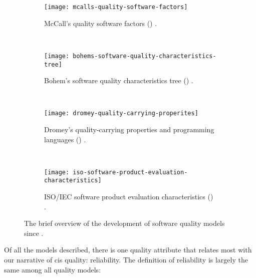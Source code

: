 \begin{figure}[htp]
  \centering
  \begin{subfigure}[b]{0.49\linewidth}
    \centering
    \texttt{[image: mcalls-quality-software-factors]}
    \caption{McCall's quality software factors (\citeyear{McCall:1977wm}) \citep{McCall:1977wm}.}
    \label{fig:background:software-quality:quality-models:development:mccall}
  \end{subfigure}
  ~
  \begin{subfigure}[b]{0.49\linewidth}
    \centering
    \texttt{[image: bohems-software-quality-characteristics-tree]}
    \caption{Bohem's software quality characteristics tree (\citeyear{Boehm:1978vv}) \citep{Boehm:1978vv}.}
    \label{fig:background:software-quality:quality-models:development:boehm}
  \end{subfigure}
  ~
  \begin{subfigure}[t]{0.49\linewidth}
    \centering
    \texttt{[image: dromey-quality-carrying-properites]}
    \caption{Dromey's quality-carrying properties and programming languages (\citeyear{Dromey:1995wy}) \citep{Dromey:1995wy}.}
    \label{fig:background:software-quality:quality-models:development:dromey}
  \end{subfigure}
  ~
  \begin{subfigure}[t]{0.49\linewidth}
    \centering
    \texttt{[image: iso-software-product-evaluation-characteristics]}
    \caption{ISO/IEC software product evaluation characteristics (\citeyear{ISO9126:1999}) \citep{ISO9126:1999}.}
    \label{fig:background:software-quality:quality-models:development:iso}
  \end{subfigure}
  \caption{The brief overview of the development of software quality models since \citeyear{McCall:1977wm}.}
  \label{fig:background:software-quality:quality-models:development}
\end{figure}

Of all the models described, there is one quality attribute that relates most with our narrative of \gls{cis} quality: reliability. The definition of reliability is largely the same among all quality models:

